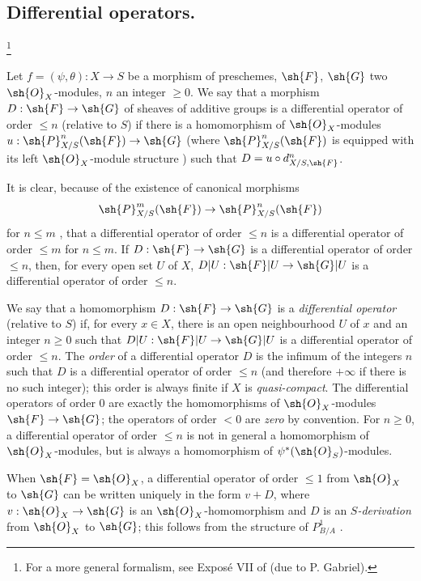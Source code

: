 \subsection{Differential operators.}
\footnote{
  For a more general formalism, see Expos\'e VII of \cite{IV-42} (due to P. Gabriel).
}
\label{IV.16.8}

\begin{definition}[16.8.1]
\label{IV.16.8.1}
Let $f = (\psi, \theta): X \to S$ be a morphism of preschemes, $\sh{F}$, $\sh{G}$ two $\sh{O}_X$-modules, $n$ an integer $\geq 0$.
We say that a morphism $D: \sh{F} \to \sh{G}$ of sheaves of additive groups is a differential operator of order $\leq n$ (relative to $S$) if there is a homomorphism of $\sh{O}_X$-modules $u: \sh{P}_{X/S}^n(\sh{F}) \to \sh{G}$ (where $\sh{P}_{X/S}^n(\sh{F})$ is equipped with its left $\sh{O}_X$-module structure ) such that $D = u \circ d_{X/S, \sh{F}}^n$.
\end{definition}

It is clear, because of the existence of canonical morphisms
\[
  \sh{P}_{X/S}^m(\sh{F}) \to \sh{P}_{X/S}^n(\sh{F})
\] 
for $n \leq m$ , that a differential operator of order $\leq n$ is a differential operator of order $\leq m$ for $n \leq m$.
If $D:\sh{F} \to \sh{G}$ is a differential operator of order $\leq n$, then, for every open set $U$ of $X$, $D|U: \sh{F}|U \to \sh{G}|U$ is a differential operator of order $\leq n$.

We say that a homomorphism $D: \sh{F} \to \sh{G}$ is a \emph{differential operator} (relative to $S$) if, for every $x \in X$, there is an open neighbourhood $U$ of $x$ and an integer $n \geq 0$ such that $D|U: \sh{F}|U \to \sh{G}|U$ is a differential operator of order $\leq n$.
The \emph{order} of a differential operator $D$ is the infimum of the integers $n$ such that $D$ is a differential operator of order $\leq n$ (and therefore $+\infty$ if there is no such integer);
this order is always finite if $X$ is \emph{quasi-compact}.
The differential operators of order $0$ are exactly the homomorphisms of $\sh{O}_X$-modules $\sh{F} \to \sh{G}$;
the operators of order $<0$ are \emph{zero} by convention.
For $n \geq 0$, a differential operator of order $\leq n$ is not in general a homomorphism of $\sh{O}_X$-modules, but is always a homomorphism of $\psi^*(\sh{O}_S)$-modules.

When $\sh{F} = \sh{O}_X$, a differential operator of order $\leq 1$ from $\sh{O}_X$ to $\sh{G}$ can be written uniquely in the form $v + D$, where $v: \sh{O}_X \to \sh{G}$ is an $\sh{O}_X$-homomorphism and $D$ is an \emph{$S$-derivation}  from $\sh{O}_X$ to $\sh{G}$; this follows from the structure of $P_{B/A}^1$ .


